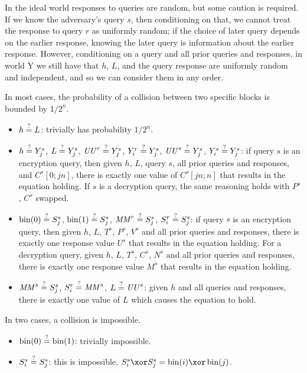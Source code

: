 \documentclass[hctr.tex]{subfiles}
\begin{document}
In the ideal world responses to queries are random,
but some caution is required.
If we know the adversary's query \(s\), then conditioning on that,
we cannot treat the response to query \(r\) as uniformly random;
if the choice of later query depends on the earlier response,
knowing the later query is information about the earlier response.
However, conditioning on a query and all prior queries and responses,
in world Y we still have that \(h\), \(L\), and the
query response are uniformly random and independent,
and so we can consider them in any order.


In most cases, the probability of a collision
between two specific blocks is bounded by \(1/2^n\).

\begin{itemize}
    \item \(h \stackrel{\text{?}}{=} L\): trivially has probability \(1/2^n\).
    \item
    \(h \stackrel{\text{?}}{=} Y_j^s\),
    \(L \stackrel{\text{?}}{=} Y_j^s\),
    \(\mathit{UU}^r \stackrel{\text{?}}{=} Y_j^s\),
    \(Y_i^r \stackrel{\text{?}}{=} Y_j^s\),
    \(\mathit{UU}^s \stackrel{\text{?}}{=} Y_j^s\), 
    \(Y_i^s \stackrel{\text{?}}{=} Y_j^s\): 
    if query \(s\) is an encryption query,
    then given \(h\), \(L\), query \(s\), 
    all prior queries and responses, and
    \(C^s[0;jn]\), there is exactly one value of
    \(C^s[jn;n]\) that results in the equation holding.
    If \(s\) is a decryption query, the same reasoning holds
    with \(P^s\), \(C^s\) swapped.
    \item 
    \(\operatorname{bin}(0) \stackrel{\text{?}}{=} S_j^s\),
    \(\operatorname{bin}(1) \stackrel{\text{?}}{=} S_j^s\),
    \(\mathit{MM}^r \stackrel{\text{?}}{=} S_j^s\),
    \(S_i^r \stackrel{\text{?}}{=} S_j^s\):
    if query \(s\) is an encryption query,
    then given \(h\), \(L\), \(T^s\),
    \(P^s\), \(V^s\)
    and all prior queries and responses,
    there is exactly one response value \(U^s\)
    that results in the equation holding.
    For a decryption query, 
    given \(h\), \(L\), \(T^s\),
    \(C^s\), \(N^s\)
    and all prior queries and responses,
    there is exactly one response value \(M^s\)
    that results in the equation holding.
    \item
    \(\mathit{MM}^s \stackrel{\text{?}}{=} S_j^s\),
    \(S_i^r \stackrel{\text{?}}{=} \mathit{MM}^s\),
    \(L \stackrel{\text{?}}{=} \mathit{UU}^s\):
    given \(h\) and all queries and responses,
    there is exactly one value of \(L\)
    which causes the equation to hold.
\end{itemize}

In two cases, a collision is impossible.

\begin{itemize}
    \item \(\operatorname{bin}(0) \stackrel{\text{?}}{=} \operatorname{bin}(1)\): trivially impossible.
    \item 
    \(S_i^s \stackrel{\text{?}}{=} S_j^s\):
    this is impossible, 
    \(S_i^s \xor S_j^s = \fromint(i) \xor \fromint(j)\).
\end{itemize}
\end{document}
